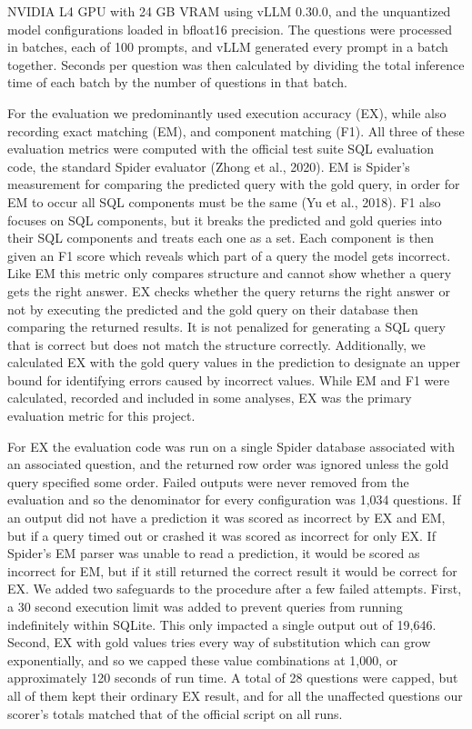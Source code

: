 NVIDIA L4 GPU with 24 GB VRAM using vLLM 0.30.0, and the unquantized model configurations loaded in bfloat16 precision. The questions were processed in batches, each of 100 prompts, and vLLM generated every prompt in a batch together. Seconds per question was then calculated by dividing the total inference time of each batch by the number of questions in that batch.

For the evaluation we predominantly used execution accuracy (EX), while also recording exact matching (EM), and component matching (F1). All three of these evaluation metrics were computed with the official test suite SQL evaluation code, the standard Spider evaluator (Zhong et al., 2020). EM is Spider's measurement for comparing the predicted query with the gold query, in order for EM to occur all SQL components must be the same (Yu et al., 2018). F1 also focuses on SQL components, but it breaks the predicted and gold queries into their SQL components and treats each one as a set. Each component is then given an F1 score which reveals which part of a query the model gets incorrect. Like EM this metric only compares structure and cannot show whether a query gets the right answer. EX checks whether the query returns the right answer or not by executing the predicted and the gold query on their database then comparing the returned results. It is not penalized for generating a SQL query that is correct but does not match the structure correctly. Additionally, we calculated EX with the gold query values in the prediction to designate an upper bound for identifying errors caused by incorrect values. While EM and F1 were calculated, recorded and included in some analyses, EX was the primary evaluation metric for this project.

For EX the evaluation code was run on a single Spider database associated with an associated question, and the returned row order was ignored unless the gold query specified some order. Failed outputs were never removed from the evaluation and so the denominator for every configuration was 1,034 questions. If an output did not have a prediction it was scored as incorrect by EX and EM, but if a query timed out or crashed it was scored as incorrect for only EX. If Spider's EM parser was unable to read a prediction, it would be scored as incorrect for EM, but if it still returned the correct result it would be correct for EX. We added two safeguards to the procedure after a few failed attempts. First, a 30 second execution limit was added to prevent queries from running indefinitely within SQLite. This only impacted a single output out of 19,646. Second, EX with gold values tries every way of substitution which can grow exponentially, and so we capped these value combinations at 1,000, or approximately 120 seconds of run time. A total of 28 questions were capped, but all of them kept their ordinary EX result, and for all the unaffected questions our scorer's totals matched that of the official script on all runs.

